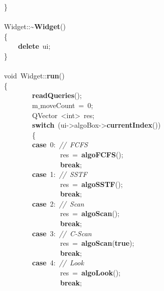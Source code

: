 \mbox{}\} \\
\mbox{} \\
\mbox{}Widget::\textasciitilde{}\textbf{Widget}() \\
\mbox{}\{ \\
\mbox{}\ \ \ \ \textbf{delete}\ ui; \\
\mbox{}\} \\
\mbox{} \\
\mbox{}void\ Widget::\textbf{run}() \\
\mbox{}\{ \\
\mbox{}\ \ \ \ \ \ \ \ \textbf{readQueries}(); \\
\mbox{}\ \ \ \ \ \ \ \ m$\_$moveCount\ =\ 0; \\
\mbox{}\ \ \ \ \ \ \ \ QVector\ \textless{}int\textgreater{}\ res; \\
\mbox{}\ \ \ \ \ \ \ \ \textbf{switch}\ (ui-\textgreater{}algoBox-\textgreater{}\textbf{currentIndex}()) \\
\mbox{}\ \ \ \ \ \ \ \ \{ \\
\mbox{}\ \ \ \ \ \ \ \ \textbf{case}\ 0:\ \textit{//\ FCFS} \\
\mbox{}\ \ \ \ \ \ \ \ \ \ \ \ \ \ \ \ res\ =\ \textbf{algoFCFS}(); \\
\mbox{}\ \ \ \ \ \ \ \ \ \ \ \ \ \ \ \ \textbf{break}; \\
\mbox{}\ \ \ \ \ \ \ \ \textbf{case}\ 1:\ \textit{//\ SSTF} \\
\mbox{}\ \ \ \ \ \ \ \ \ \ \ \ \ \ \ \ res\ =\ \textbf{algoSSTF}(); \\
\mbox{}\ \ \ \ \ \ \ \ \ \ \ \ \ \ \ \ \textbf{break}; \\
\mbox{}\ \ \ \ \ \ \ \ \textbf{case}\ 2:\ \textit{//\ Scan} \\
\mbox{}\ \ \ \ \ \ \ \ \ \ \ \ \ \ \ \ res\ =\ \textbf{algoScan}(); \\
\mbox{}\ \ \ \ \ \ \ \ \ \ \ \ \ \ \ \ \textbf{break}; \\
\mbox{}\ \ \ \ \ \ \ \ \textbf{case}\ 3:\ \textit{//\ C-Scan} \\
\mbox{}\ \ \ \ \ \ \ \ \ \ \ \ \ \ \ \ res\ =\ \textbf{algoScan}(\textbf{true}); \\
\mbox{}\ \ \ \ \ \ \ \ \ \ \ \ \ \ \ \ \textbf{break}; \\
\mbox{}\ \ \ \ \ \ \ \ \textbf{case}\ 4:\ \textit{//\ Look} \\
\mbox{}\ \ \ \ \ \ \ \ \ \ \ \ \ \ \ \ res\ =\ \textbf{algoLook}(); \\
\mbox{}\ \ \ \ \ \ \ \ \ \ \ \ \ \ \ \ \textbf{break}; \\

